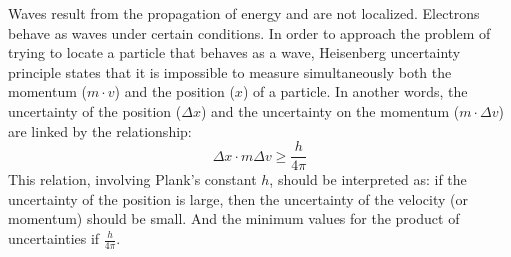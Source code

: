 \documentclass[main.tex]{subfiles}
\newcommand\chapterlabel{electrons}
\begin{document}
\begin{description}
\begin{center}
   \end{center}
   
   

\item[\docfilehook{The uncertainty principle}{}] 
Waves result from the propagation of energy and are not localized. Electrons behave as waves under certain conditions. In order to approach the problem of trying to locate a particle that behaves as a wave, Heisenberg uncertainty principle states that it is impossible to measure simultaneously both the momentum ($m\cdot v$) and the position ($x$) of a particle. In another words, the uncertainty of the position ($\Delta x$) and the uncertainty on the momentum ($m\cdot \Delta v$) are linked by the relationship:
\begin{equation}
\Delta x\cdot m\Delta v \geq \frac{h}{4\pi} 
\end{equation}
This relation, involving Plank's constant $h$, should be interpreted as: if the uncertainty of the position is large, then the uncertainty of the velocity (or momentum) should be small. And the minimum values for the product of uncertainties if $\frac{h}{4\pi} $. 



\end{description}
\end{document}
